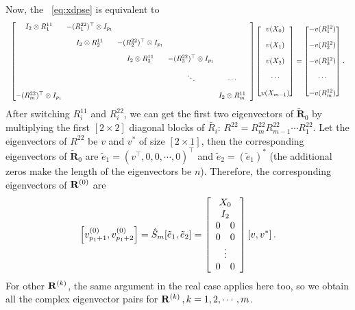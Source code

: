Now, the \pse\ \eqref{eq:xdpse} is equivalent to
\begin{equation}
  \label{eq:xdpsdcomplex}
  \resizebox{\linewidth}{!}{%
    $
    \setlength{\arraycolsep}{3pt}
    \begin{bmatrix}
      I_{2}\otimes R^{11}_{1} & -(R^{22}_{1})^\top \otimes I_{p_{1}} &  & \\[1em]
      & I_{2}\otimes R^{11}_{2} & -(R^{22}_{2})^\top  \otimes I_{p_{1}} &  &\\[1em]
      &  & I_{2}\otimes R^{11}_{3} & -(R^{22}_{3})^\top \otimes I_{p_{1}} &  &\\[1em]
      & & & \ddots &\cdots & \\[1em]
      -(R^{22}_{m})^\top \otimes I_{p_{1}} & & & & I_{2}\otimes R^{11}_{m}
    \end{bmatrix}
    \begin{bmatrix}
      v(X_{0}) \\[1em]
      v(X_{1})  \\[1em]
      v(X_{2})  \\[1em]
      \cdots \\[1em]
      v(X_{m-1})
    \end{bmatrix}
    =
    \begin{bmatrix}
      -v(R^{12}_{1}) \\[1em]
      -v(R^{12}_{2}) \\[1em]
      -v(R^{12}_{3}) \\[1em]
      \cdots \\[1em]
      -v(R^{12}_{m})
    \end{bmatrix} $%
  }
  \,.
\end{equation}
After switching $R^{11}_{i}$ and $R^{22}_{i}$, we can get the first two
eigenvectors of $\mathbf{\tilde{R}}_{0}$ by multiplying the first
$[2\!\times\! 2]$ diagonal blocks of $\tilde{R_{i}}$:
$R^{22}=R^{22}_{m}R^{22}_{m-1}\cdots R^{22}_{1}$. Let the eigenvectors of
$R^{22}$ be $v$ and $v^{*}$ of size $[2\!\times\! 1]$, then the
corresponding eigenvectors of $\mathbf{\tilde{R}}_{0}$ are
$\tilde{e}_{1}=(v^\top,0,0,\cdots,0)^\top $ and
$\tilde{e}_{2}=(\tilde{e}_{1})^{*}$ (the additional zeros make the length
of the eigenvectors be $n$). Therefore, the corresponding eigenvectors
of $\mathbf{R}^{(0)}$ are
\[
  \left[v_{p_{1}+1}^{(0)},v_{p_{1}+2}^{(0)}\right]
  =\hat{S}_{m}[\tilde{e}_{1},\tilde{e}_{2}]
  = \left[
    \begin{array}{c}
      X_{0} \\
      I_{2}    \\
      0 \quad 0\\
      0 \quad 0\\
      \vdots\\
      0 \quad 0
    \end{array}
  \right]
  [v,v^{*}]
  \,.
\]
For other $\mathbf{R}^{(k)}$, the same argument in the real case applies
here too, so we obtain all the complex eigenvector pairs for
$\mathbf{R}^{(k)}\,,k=1,2,\cdots,m$.


